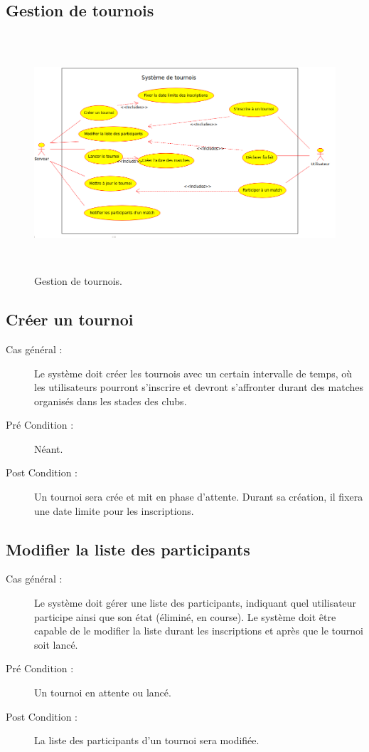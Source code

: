 \documentclass[a4paper]{report}
\begin{document}
\subsection{Gestion de tournois}
\begin{figure}[h]
    \caption{\label{1} Gestion de tournois.}
    \begin{center}
        \includegraphics[height=250pt]{uml/servTournoi.png}
    \end{center}
\end{figure}
\subsection{Créer un tournoi}
\begin{description}
    \item[Cas général :] Le système doit créer les tournois avec un certain intervalle de temps, où les \glspl{utilisateur} pourront s'inscrire et devront s'affronter durant des matches organisés dans les stades des \glspl{club}.
    \item[Pré Condition  :] Néant.
    \item[Post Condition :] Un tournoi sera crée et mit en phase d'attente.
        Durant sa création, il fixera une date limite pour les inscriptions.
\end{description}

\subsection{Modifier la liste des \glspl{participant}}
\begin{description}
    \item[Cas général :] Le système doit gérer une liste des \glspl{participant}, indiquant quel \gls{utilisateur} participe ainsi que son état (éliminé, en course). Le système doit être capable de le modifier la liste durant les inscriptions et après que le tournoi soit lancé.
    \item[Pré Condition  :] Un tournoi en attente ou lancé.
    \item[Post Condition :] La liste des \glspl{participant} d'un tournoi sera modifiée.
\end{description}
\end{document}
